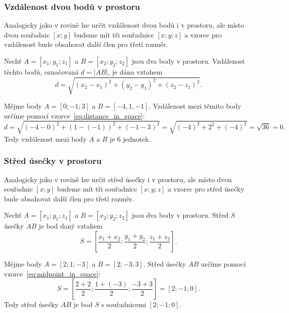 \subsubsection{Vzdálenost dvou bodů v prostoru}\label{subsubsec:Distance_between_points_in_space}
Analogicky jako v rovině lze určit vzdálenost dvou bodů i v prostoru, ale místo dvou souřadnic $[x;y]$ budeme mít tři souřadnice $[x;y;z]$ a vzorec pro vzdálenost bude obsahovat další člen pro třetí rozměr.
\begin{definition}\label{def:distance_in_space}
    Nechť $A = [x_1; y_1; z_1]$ a $B = [x_2; y_2; z_2]$ jsou dva body v prostoru.
    Vzdálenost těchto bodů, označovaná $d = |AB|$, je dána vztahem
    \begin{equation}\label{eq:distance_in_space}
        d = \sqrt{(x_2 - x_1)^2 + (y_2 - y_1)^2 + (z_2 - z_1)^2}.
    \end{equation}
\end{definition}

\begin{example}
    Mějme body $A = [0;-1;3]$ a $B = [-4,1,-1]$.
    Vzdálenost mezi těmito body určíme pomocí vzorce~\eqref{eq:distance_in_space}:
    \[
    d = \sqrt{(-4 - 0)^2 + (1 - (-1))^2 + (-1 - 3)^2} = \sqrt{(-4)^2 + 2^2 + (-4)^2}  = \sqrt{36} = 6.
    \]
    Tedy vzdálenost mezi body $A$ a $B$ je $6$ jednotek.
\end{example}


\subsubsection{Střed úsečky v prostoru}\label{subsubsec:Midpoint_of_segment_in_space}
Analogicky jako v rovině lze určit střed úsečky i v prostoru, ale místo dvou souřadnic $[x;y]$ budeme mít tři souřadnice $[x;y;z]$ a vzorec pro střed úsečky bude obsahovat další člen pro třetí rozměr.
\begin{definition}\label{def:midpoint_in_space}
    Nechť $A = [x_1; y_1; z_1]$ a $B = [x_2; y_2; z_2]$ jsou dva body v prostoru.
    Střed $S$ úsečky $AB$ je bod daný vztahem
    \begin{equation}\label{eq:midpoint_in_space}
        S = \left[\frac{x_1 + x_2}{2}; \frac{y_1 + y_2}{2}; \frac{z_1 + z_2}{2}\right].
    \end{equation}
\end{definition}

\begin{example}
    Mějme body $A = [2;1;-3]$ a $B = [2;-3;3]$.
    Střed úsečky $AB$ určíme pomocí vzorce~\eqref{eq:midpoint_in_space}:
    \[
    S = \left[\frac{2 + 2}{2}; \frac{1 + (-3)}{2}; \frac{-3 + 3}{2}\right] = \left[2; -1; 0\right].
    \]
    Tedy střed úsečky $AB$ je bod $S$ s souřadnicemi $[2; -1; 0]$.
\end{example}

